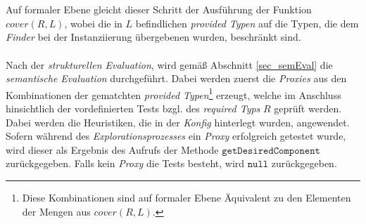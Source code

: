 \\\\
Auf formaler Ebene gleicht dieser Schritt der Ausführung der Funktion $\mathit{cover(R,L)}$, wobei die in $L$ befindlichen \emph{provided Typen} auf die Typen, die dem \emph{Finder} bei der Instanziierung übergebenen wurden, beschränkt sind.
\\\\
Nach der \emph{strukturellen Evaluation}, wird gemäß Abschnitt \ref{sec_semEval} die \emph{semantische Evaluation} durchgeführt. Dabei werden zuerst die \emph{Proxies} aus den Kombinationen der gematchten \emph{provided Typen}\footnote{Diese Kombinationen sind auf formaler Ebene Äquivalent zu den Elementen der Mengen aus $\mathit{cover(R,L)}$.} erzeugt, welche im Anschluss hinsichtlich der vordefinierten Tests bzgl. des \emph{required Typs} $R$ geprüft werden. Dabei werden die \Gls{Heuristik}en, die in der \emph{Konfig} hinterlegt wurden, angewendet. Sofern während des \emph{Explorationsprozesses} ein \emph{Proxy} erfolgreich getestet wurde, wird dieser als Ergebnis des Aufrufs der Methode $\texttt{getDesiredComponent}$ zurückgegeben. Falls kein \emph{Proxy} die Tests besteht, wird $\texttt{null}$ zurückgegeben.
